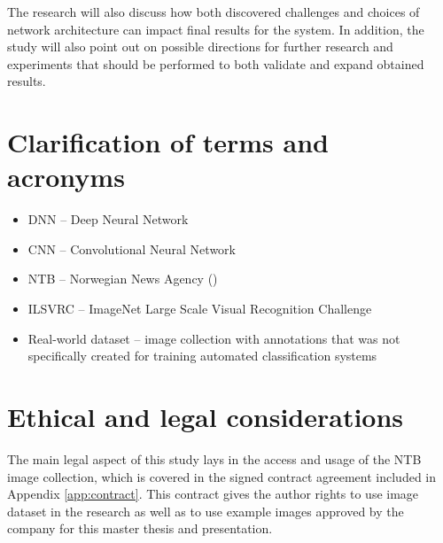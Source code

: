     The research will also discuss how both discovered challenges and choices of network architecture can impact final results for the system. In addition, the study will also point out on possible directions for further research and experiments that should be performed to both validate and expand obtained results.
    

\section{Clarification of terms and acronyms}
    \begin{itemize}
        \item DNN -- Deep Neural Network
        \item CNN -- Convolutional Neural Network
        \item NTB -- Norwegian News Agency ()
        \item ILSVRC -- ImageNet Large Scale Visual Recognition Challenge
        \item Real-world dataset -- image collection with annotations that was not specifically created for training automated classification systems
    \end{itemize}

\section{Ethical and legal considerations}
    The main legal aspect of this study lays in the access and usage of the NTB image collection, which is covered in the signed contract agreement included in Appendix \ref{app:contract}. This contract gives the author rights to use image dataset in the research as well as to use example images approved by the company for this master thesis and presentation.